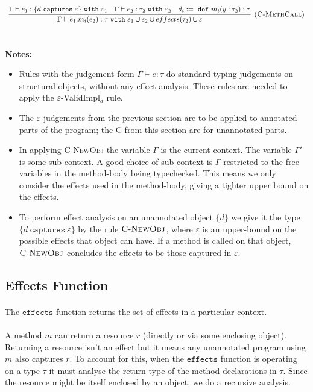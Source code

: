 \documentclass{llncs}
\newcommand{\keywadj}[1]{\mathtt{#1}}
\newcommand{\keyw}[1]{\keywadj{#1}~}
\begin{document}
\[
\begin{array}{c}
\infer[\textsc{(C-MethCall)}]
	{\Gamma \vdash e_1.m_i(e_2) : \tau~ \keyw{with} \varepsilon_1 \cup \varepsilon_2 \cup effects(\tau_2) \cup \varepsilon}
	{\Gamma \vdash e_1 : \{ \bar d~\keyw{captures} \varepsilon \}~\keyw{with} \varepsilon_1 & \Gamma \vdash e_2:\tau_2~\keyw{with} \varepsilon_2&d_i :=~\keyw{def} m_i(y:\tau_2):\tau } \\[5ex]
\end{array}
\]


\noindent \textbf{Notes:}

\begin{itemize}
	\item Rules with the judgement form $\Gamma \vdash e : \tau$ do standard typing judgements on structural objects, without any effect analysis. These rules are needed to apply the $\varepsilon$-ValidImpl$_d$ rule.
	\item The \textsc{$\varepsilon$} judgements from the previous section are to be applied to annotated parts of the program; the \textsc{C} from this section are for unannotated parts.
	\item In applying \textsc{C-NewObj} the variable $\Gamma$ is the current context. The variable $\Gamma'$ is some sub-context. A good choice of sub-context is $\Gamma$ restricted to the free variables in the method-body being typechecked. This means we only consider the effects used in the method-body, giving a tighter upper bound on the effects.
	\item To perform effect analysis on an unannotated object $\{ \bar d \}$ we give it the type $\{ \bar d~\keyw{captures} \varepsilon \}$ by the rule $\textsc{C-NewObj}$, where $\varepsilon$ is an upper-bound on the possible effects that object can have. If a method is called on that object, $\textsc{C-NewObj}$ concludes the effects to be those captured in $\varepsilon$.
\end{itemize}

\subsection{Effects Function}

\paragraph{}
The $\keywadj{effects}$ function returns the set of effects in a particular context.

\paragraph{}
A method $m$ can return a resource $r$ (directly or via some enclosing object). Returning a resource isn't an effect but it means any unannotated program using $m$ also captures $r$. To account for this, when the $\keywadj{effects}$ function is operating on a type $\tau$ it must analyse the return type of the method declarations in $\tau$. Since the resource might be itself enclosed by an object, we do a recursive analysis.
\end{document}
